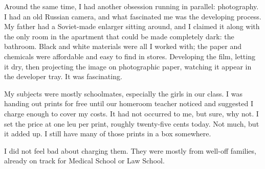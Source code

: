 \documentclass[12pt]{book}
\begin{document}
Around the same time, I had another obsession running in parallel:
photography. I had an old Russian camera, and what fascinated me was the
developing process. My father had a Soviet-made enlarger sitting around,
and I claimed it along with the only room in the apartment that could be
made completely dark: the bathroom. Black and white materials were all I
worked with; the paper and chemicals were affordable and easy to find in
stores. Developing the film, letting it dry, then projecting the image
on photographic paper, watching it appear in the developer tray. It was
fascinating.

My subjects were mostly schoolmates, especially the girls in our class.
I was handing out prints for free until our homeroom teacher noticed and
suggested I charge enough to cover my costs. It had not occurred to me,
but sure, why not. I set the price at one leu per print, roughly
twenty-five cents today. Not much, but it added up. I still have many of
those prints in a box somewhere.

I did not feel bad about charging them. They were mostly from well-off
families, already on track for Medical School or Law School.
\end{document}
